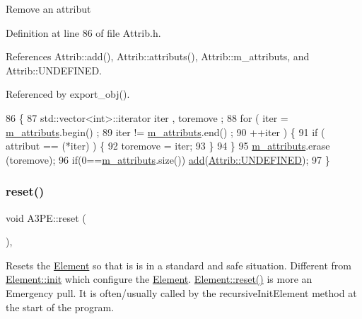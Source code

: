 Remove an attribut 

Definition at line 86 of file Attrib.\+h.



References Attrib\+::add(), Attrib\+::attributs(), Attrib\+::m\+\_\+attributs, and Attrib\+::\+U\+N\+D\+E\+F\+I\+N\+ED.



Referenced by export\+\_\+obj().


\begin{DoxyCode}
86                                \{
87     std::vector<int>::iterator iter , toremove ;
88     \textcolor{keywordflow}{for} ( iter  = \hyperlink{classAttrib_ac4bd58a0cc6b38a3b711d609a3d3aacc}{m\_attributs}.begin() ;
89           iter != \hyperlink{classAttrib_ac4bd58a0cc6b38a3b711d609a3d3aacc}{m\_attributs}.end()   ;
90           ++iter ) \{
91       \textcolor{keywordflow}{if} ( attribut == (*iter) ) \{
92         toremove = iter;
93       \}
94     \}
95     \hyperlink{classAttrib_ac4bd58a0cc6b38a3b711d609a3d3aacc}{m\_attributs}.erase (toremove);
96     \textcolor{keywordflow}{if}(0==\hyperlink{classAttrib_ac4bd58a0cc6b38a3b711d609a3d3aacc}{m\_attributs}.size()) \hyperlink{classAttrib_a235f773af19c900264a190b00a3b4ad7}{add}(\hyperlink{classAttrib_a69e171d7cc6417835a5a306d3c764235a3a8da2ab97dda18aebab196fe4100531}{Attrib::UNDEFINED});
97   \}
\end{DoxyCode}
\mbox{\label{classA3PE_a449775588222d544aeeaab190d553652}} 
\subsubsection{\texorpdfstring{reset()}{reset()}}
{\footnotesize\ttfamily void A3\+P\+E\+::reset (\begin{DoxyParamCaption}{ }\end{DoxyParamCaption})\hspace{0.3cm}{\ttfamily [inline]}, {\ttfamily [virtual]}}

Resets the \hyperlink{classElement}{Element} so that is is in a standard and safe situation. Different from \hyperlink{classElement_af42754b5cabc198869222725218d695c}{Element\+::init} which configure the \hyperlink{classElement}{Element}. \hyperlink{classElement_a69efffa22f06909d768149715565cb56}{Element\+::reset()} is more an Emergency pull. It is often/usually called by the recursive\+Init\+Element method at the start of the program. 


